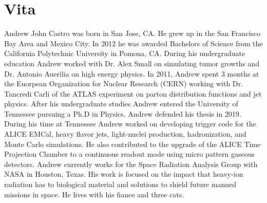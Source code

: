 \chapter*{Vita} \label{ch:vita}
Andrew John Castro was born in San Jose, CA.  He grew up in the San Francisco Bay Area and Mexico City.  In 2012 he was awarded  Bachelors of Science from the California Polytechnic University in Pomona, CA.  During his undergraduate education Andrew worked with Dr. Alex Small on simulating tumor growths and Dr. Antonio Auerilia on high energy physics.  In 2011, Andrew spent 3 months at the Euorpean Organization for Nuclear Research (CERN) working with Dr. Tancredi Carli of the ATLAS experiment on parton distribution functions and jet physics.  
After his undergraduate studies Andrew entered the University of Tennessee pursuing a Ph.D in Physics.  Andrew defended his thesis in 2019.  During his time at Tennessee Andrew worked on developing trigger code for the ALICE EMCal, heavy flavor jets, light-nuclei production, hadronization, and Monte Carlo simulations.  He also contributed to the upgrade of the ALICE Time Projection Chamber to a continuous readout mode using micro pattern gaseous detectors.  
Andrew currently works for the Space Radiation Analysis Group with NASA in Houston, Texas. His work is focused on the impact that heavy-ion radiation has to biological material and solutions to shield future manned missions in space.  He lives with his fiance and three cats.
